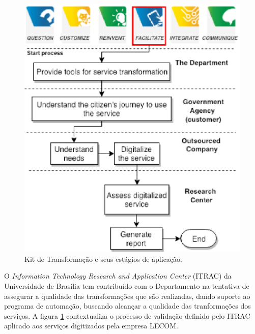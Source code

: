 \begin{figure}[h]
    \centering
    \includegraphics{figuras/kitTransformacao.eps}
    \caption[Referencial Teórico]{Kit de Transformação e seus estágios de aplicação.}
    \label{img:kitTransformacao}
\end{figure}

O \textit{Information Technology Research and Application Center} (ITRAC) da Universidade de Brasília tem contribuído com o 
Departamento na tentativa de assegurar a qualidade das transformações que são realizadas, dando suporte ao programa de automação, 
buscando alcançar a qualidade das tranformações dos serviços. A figura \ref{img:kitTransformacao} contextualiza o processo de 
validação definido pelo ITRAC aplicado aos serviços digitizados pela empresa LECOM. 





